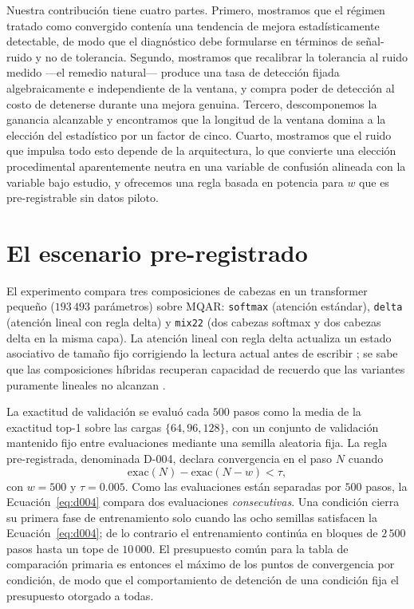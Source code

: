 \documentclass[jou,11pt,donotrepeattitle]{apa7}
\begin{document}
Nuestra contribuci\'on tiene cuatro partes. Primero, mostramos que el r\'egimen tratado como
convergido conten\'ia una tendencia de mejora estad\'isticamente detectable, de modo que el
diagn\'ostico debe formularse en t\'erminos de se\~nal-ruido y no de tolerancia. Segundo,
mostramos que recalibrar la tolerancia al ruido medido ---el remedio natural--- produce una tasa
de detecci\'on fijada algebraicamente e independiente de la ventana, y compra poder de
detecci\'on al costo de detenerse durante una mejora genuina. Tercero, descomponemos la ganancia
alcanzable y encontramos que la longitud de la ventana domina a la elecci\'on del estad\'istico
por un factor de cinco. Cuarto, mostramos que el ruido que impulsa todo esto depende de la
arquitectura, lo que convierte una elecci\'on procedimental aparentemente neutra en una variable
de confusi\'on alineada con la variable bajo estudio, y ofrecemos una regla basada en potencia
para $w$ que es pre-registrable sin datos piloto.

\section{El escenario pre-registrado}

El experimento compara tres composiciones de cabezas en un transformer peque\~no
($193\,493$ par\'ametros) sobre MQAR: \texttt{softmax} (atenci\'on est\'andar), \texttt{delta}
(atenci\'on lineal con regla delta) y \texttt{mix22} (dos cabezas softmax y dos cabezas delta en
la misma capa). La atenci\'on lineal con regla delta actualiza un estado asociativo de tama\~no
fijo corrigiendo la lectura actual antes de escribir \parencite{yang2024gated}; se sabe que las
composiciones h\'ibridas recuperan capacidad de recuerdo que las variantes puramente lineales no
alcanzan \parencite{arora2023zoology,arora2024simple}.

La exactitud de validaci\'on se evalu\'o cada $500$ pasos como la media de la exactitud top-1
sobre las cargas $\{64, 96, 128\}$, con un conjunto de validaci\'on mantenido fijo entre
evaluaciones mediante una semilla aleatoria fija. La regla pre-registrada, denominada D-004,
declara convergencia en el paso $N$ cuando
%
\begin{equation}
\mathrm{exac}(N) - \mathrm{exac}(N - w) < \tau ,
\label{eq:d004}
\end{equation}
%
con $w = 500$ y $\tau = 0.005$. Como las evaluaciones est\'an separadas por $500$ pasos, la
Ecuaci\'on~\ref{eq:d004} compara dos evaluaciones \emph{consecutivas}. Una condici\'on cierra su
primera fase de entrenamiento solo cuando las ocho semillas satisfacen la
Ecuaci\'on~\ref{eq:d004}; de lo contrario el entrenamiento contin\'ua en bloques de $2\,500$
pasos hasta un tope de $10\,000$. El presupuesto com\'un para la tabla de comparaci\'on primaria
es entonces el m\'aximo de los puntos de convergencia por condici\'on, de modo que el
comportamiento de detenci\'on de una condici\'on fija el presupuesto otorgado a todas.
\end{document}
